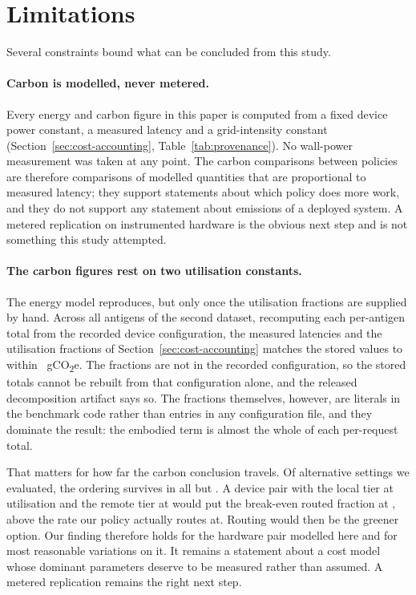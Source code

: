 \section{Limitations}
\label{sec:limitations}

Several constraints bound what can be concluded from this study.

\paragraph{Carbon is modelled, never metered.} Every energy and carbon figure in
this paper is computed from a fixed device power constant, a measured latency
and a grid-intensity constant (Section~\ref{sec:cost-accounting},
Table~\ref{tab:provenance}). No wall-power measurement was taken at any point.
The carbon comparisons between policies are therefore comparisons of modelled
quantities that are proportional to measured latency; they support statements
about which policy does more work, and they do not support any statement about
emissions of a deployed system. A metered replication on instrumented hardware
is the obvious next step and is not something this study attempted.


\paragraph{The carbon figures rest on two utilisation constants.} The energy
model reproduces, but only once the utilisation fractions are
supplied by hand. Across all \CarbonSequencesChecked{} antigens of the second
dataset, recomputing each per-antigen total from the recorded device
configuration, the measured latencies and the utilisation fractions of
Section~\ref{sec:cost-accounting} matches the stored values to within
\CarbonReconstructionError{}~gCO\textsubscript{2}e. The fractions are not in
the recorded configuration, so the stored totals cannot be rebuilt from that
configuration alone, and the released decomposition artifact says so. The
fractions themselves,
however, are literals in the benchmark code rather than entries in any
configuration file, and they dominate the result: the embodied term is almost
the whole of each per-request total.

That matters for how far the carbon conclusion travels. Of
\CarbonFractionSettingsTested{} alternative settings we evaluated, the ordering
survives in all but \CarbonFractionSettingsFlipping{}. A device pair with the
local tier at \CarbonFlipLocalFraction{} utilisation and the remote tier at
\CarbonFlipEdgeFraction{} would put the break-even routed fraction at
\CarbonFlipBreakEven{}, above the rate our policy actually routes at. Routing
would then be the greener option. Our finding therefore holds for the hardware
pair modelled here and for most reasonable variations on it. It remains a
statement about a cost model whose dominant parameters deserve to be measured
rather than assumed. A metered replication remains the right next
step.

